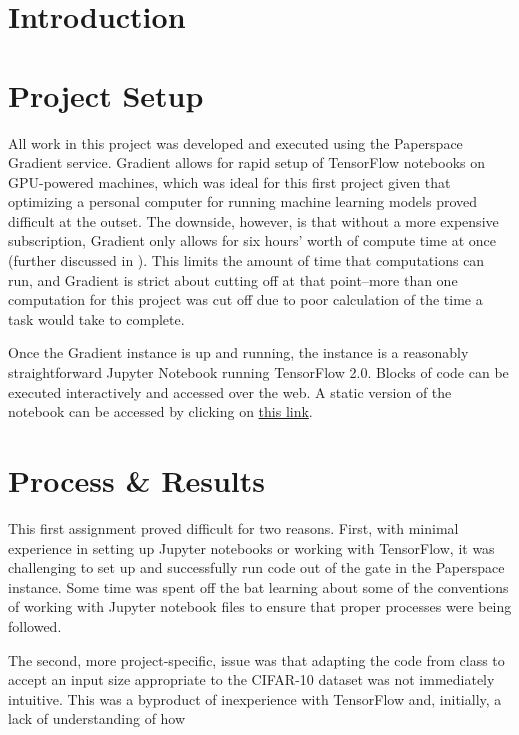 \documentclass{article}
\begin{document}
  
  \graphicspath{{./images/}}
\section{Introduction}

\section{Project Setup}
\par All work in this project was developed and executed using the Paperspace Gradient service.
Gradient allows for rapid setup of TensorFlow notebooks on GPU-powered machines, which was ideal for this first project given that optimizing a personal computer for running machine learning models proved difficult at the outset.
The downside, however, is that without a more expensive subscription, Gradient only allows for six hours' worth of compute time at once (further discussed in ).
This limits the amount of time that computations can run, and Gradient is strict about cutting off at that point--more than one computation for this project was cut off due to poor calculation of the time a task would take to complete.

\par Once the Gradient instance is up and running, the instance is a reasonably straightforward Jupyter Notebook running TensorFlow 2.0.
Blocks of code can be executed interactively and accessed over the web.
A static version of the notebook can be accessed by clicking on \href{https://console.paperspace.com/te7vzjiu3/notebook/prz0iko1d}{this link}.

\section{Process \& Results} \label{procresults}
\par This first assignment proved difficult for two reasons. 
First, with minimal experience in setting up Jupyter notebooks or working with TensorFlow, it was challenging to set up and successfully run code out of the gate in the Paperspace instance.
Some time was spent off the bat learning about some of the conventions of working with Jupyter notebook files to ensure that proper processes were being followed.

\par The second, more project-specific, issue was that adapting the code from class to accept an input size appropriate to the CIFAR-10 dataset was not immediately intuitive.
This was a byproduct of inexperience with TensorFlow and, initially, a lack of understanding of how 
\end{document}
